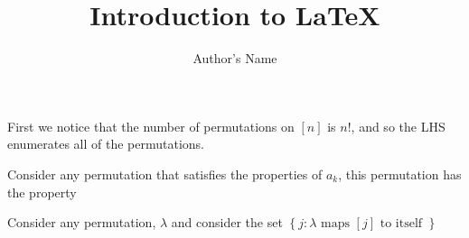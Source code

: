 \documentclass{article}
\begin{document}
\title{Introduction to \LaTeX{}}
\author{Author's Name}

\maketitle

First we notice that the number of permutations on $\left[ n \right]$ is $n!$, and so the LHS enumerates all of the permutations. 

Consider any permutation that satisfies the properties of $a_{k}$, this permutation has the property 

Consider any permutation, $\lambda$ and consider the set $\left\{ j : \lambda \text{ maps } \left[ j \right] \text{ to itself } \right\}$ 
\end{document}

